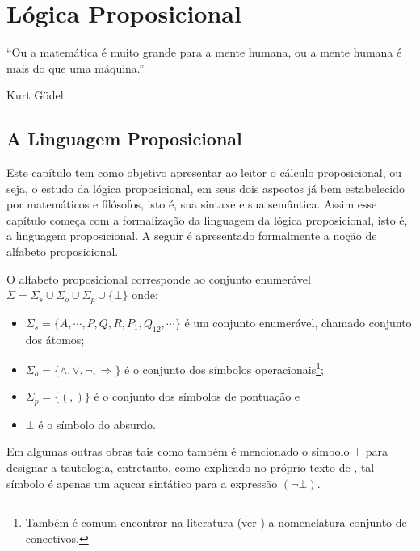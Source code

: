 \chapter{Lógica Proposicional}\label{cap:LogicsPropositional}

\epigraph{``Ou a matemática é muito grande para a mente humana, ou a mente humana é mais do que uma máquina.''}{Kurt Gödel}

\section{A Linguagem Proposicional}\label{A Linguagem proposicional}

Este capítulo tem como objetivo apresentar ao leitor o cálculo proposicional, ou seja, o estudo da lógica proposicional, em seus dois aspectos já bem estabelecido por matemáticos e filósofos, isto é,  sua sintaxe e sua semântica. Assim esse capítulo começa com a formalização da linguagem da lógica proposicional, isto é, a linguagem proposicional. A seguir é apresentado formalmente a noção de alfabeto proposicional.

\begin{definicao}\label{def:AlfabetoProposicional}
  O alfabeto proposicional corresponde ao conjunto enumerável $\Sigma = \Sigma_s \cup \Sigma_o \cup \Sigma_p \cup \{\bot\}$ onde:
  \begin{itemize}
      \item $\Sigma_s = \{A, \cdots, P, Q, R, P_1, Q_{12}, \cdots\}$ é um conjunto enumerável, chamado conjunto dos átomos;
      \item $\Sigma_o = \{\land, \lor, \neg, \Rightarrow\}$ é o conjunto dos símbolos operacionais\footnote{Também é comum encontrar na literatura (ver \cite{joaoPavao2014}) a nomenclatura conjunto de conectivos.};
      \item $\Sigma_p = \{(, )\}$ é o conjunto dos símbolos de pontuação e
      \item $\bot$ é o símbolo do absurdo.
  \end{itemize}
\end{definicao}

Em algumas outras obras tais como \cite{carmo2013} também é mencionado o símbolo $\top$ para designar a tautologia, entretanto, como explicado no próprio texto de \cite{carmo2013}, tal símbolo é apenas um açucar sintático para a expressão $(\neg \bot)$.

